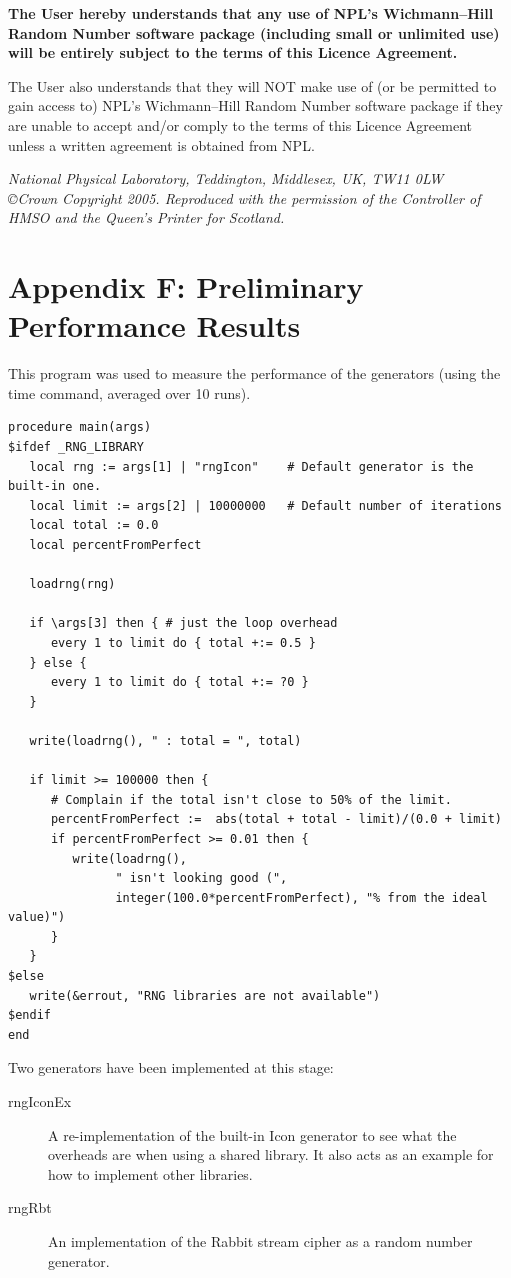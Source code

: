 \documentclass[letterpaper,12pt]{article}
\begin{document}
{{\bf
The User hereby understands that any use of NPL's Wichmann--Hill Random
Number software package (including small or unlimited use) will be entirely
subject to the terms of this Licence Agreement.

The User also understands that they will NOT make use of (or be permitted
to gain access to) NPL's Wichmann--Hill Random Number software package if
they are unable to accept and/or comply to the terms of this Licence
Agreement unless a written agreement is obtained from NPL.
}

{\em
National Physical Laboratory, Teddington, Middlesex, UK, TW11 0LW\\
\copyright Crown Copyright 2005. Reproduced with the permission of the
Controller of HMSO and the Queen's Printer for Scotland.
}
}%

\pagebreak
\section*{Appendix F: Preliminary Performance Results}
This program was used to measure the performance of the generators (using
the time command, averaged over 10 runs).
{\small
\begin{verbatim}
procedure main(args)
$ifdef _RNG_LIBRARY
   local rng := args[1] | "rngIcon"    # Default generator is the built-in one.
   local limit := args[2] | 10000000   # Default number of iterations
   local total := 0.0
   local percentFromPerfect

   loadrng(rng)

   if \args[3] then { # just the loop overhead
      every 1 to limit do { total +:= 0.5 }
   } else {
      every 1 to limit do { total +:= ?0 }
   }

   write(loadrng(), " : total = ", total)

   if limit >= 100000 then {
      # Complain if the total isn't close to 50% of the limit.
      percentFromPerfect :=  abs(total + total - limit)/(0.0 + limit)
      if percentFromPerfect >= 0.01 then {
         write(loadrng(), 
               " isn't looking good (", 
               integer(100.0*percentFromPerfect), "% from the ideal value)")
      }
   }
$else
   write(&errout, "RNG libraries are not available")
$endif
end
\end{verbatim}
}
\newpage\noindent
Two generators have been implemented at this stage:
\begin{description}
\item[{\sf rngIconEx}]
  A re-implementation of the built-in Icon generator to see what the
  overheads are when using a shared library. It also acts as an example for
  how to implement other libraries.
\item[{\sf rngRbt}]
  An implementation of the Rabbit stream cipher as a random number
  generator.
\end{description}
\end{document}
